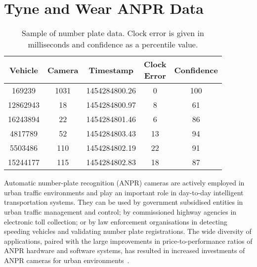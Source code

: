 \section{Tyne and Wear ANPR Data}\label{s.ncl}

\begin{table}[!ht]
\centering
\tabcolsep=0.17cm
\small
\begin{tabular}{c c c c c}
  \hline
  Vehicle & Camera & Timestamp & \thead{Clock \\Error} & Confidence \\
  \hline
  169239 & 1031 & 1454284800.26 &   0 & 100 \\
  12862943 & 18 & 1454284800.97 &   8 &  61 \\
  16243894 & 22 & 1454284801.46 &   6 &  86 \\
  4817789 & 52 & 1454284803.43 &  13 &  94 \\
  5503486 & 110 & 1454284802.19 &  22 &  91 \\
  15244177 & 115 & 1454284802.83 &  18 &  87 \\
   \hline
\end{tabular}
\caption{Sample of number plate data. Clock error is given in milliseconds and confidence as a percentile value.}
\label{t:np_data_example}
\end{table}

Automatic number-plate recognition (ANPR) cameras are actively employed in urban traffic environments and play an important role in day-to-day intelligent transportation systems. They can be used by government subsidised entities in urban traffic management and control; by commissioned highway agencies in electronic toll collection; or by law enforcement organisations in detecting speeding vehicles and validating number plate registrations. The wide diversity of applications, paired with the large improvements in price-to-performance ratios of ANPR hardware and software systems, has resulted in increased investments of ANPR cameras for urban environments~\cite{EvolutionUTMC2013, SurveyITS2011}.

